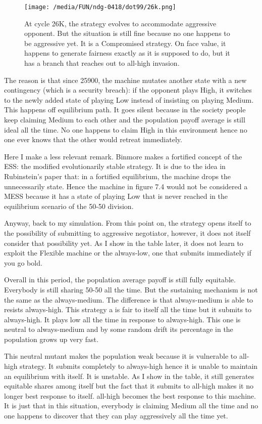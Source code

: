 \documentclass[12.5pt]{report}
\begin{document}
\begin{figure}[h!]
\center
\texttt{[image: /media/FUN/ndg-0418/dot99/26k.png]}
\caption{At cycle 26K, the strategy evolves to accommodate aggressive opponent. But the situation is still fine because no one happens to be aggressive yet. It is a Compromised strategy. On face value, it happens to generate fairness exactly as it is supposed to do, but it has a branch that reaches out to all-high invasion.}
\end{figure}

The reason is that since 25900, the machine mutates another state with a new contingency (which is a security breach): if the opponent plays High, it switches to the newly added state of playing Low instead of insisting on playing Medium. This happens off equilibrium path. It goes silent because in the society people keep claiming Medium to each other and the population payoff average is still ideal all the time. No one happens to claim High in this environment hence no one ever knows that the other would retreat immediately.

Here I make a less relevant remark. Binmore makes a fortified concept of the ESS: the modified evolutionarily stable strategy. It is due to the idea in Rubinstein's paper that: in a fortified equilibrium, the machine drops the unnecessarily state. Hence the machine in figure 7.4 would not be considered a MESS because it has a state of playing Low that is never reached in the equilibrium scenario of the 50-50 division.

Anyway, back to my simulation. From this point on, the strategy opens itself to the possibility of submitting to aggressive negotiator, however, it does not itself consider that possibility yet. As I show in the table later, it does not learn to exploit the Flexible machine or the always-low, one that submits immediately if you go bold.

Overall in this period, the population average payoff is still fully equitable. Everybody is still sharing 50-50 all the time. But the sustaining mechanism is not the same as the always-medium. The difference is that always-medium is able to resists always-high. This strategy a is fair to itself all the time but it submits to always-high. It plays low all the time in response to always-high. This one is neutral to always-medium and by some random drift its percentage in the population grows up very fast.

This neutral mutant makes the population weak because it is vulnerable to all-high strategy. It submits completely to always-high hence it is unable to maintain an equilibrium with itself. It is unstable. As I show in the table, it still generates equitable shares among itself but the fact that it submits to all-high makes it no longer best response to itself. all-high becomes the best response to this machine. It is just that in this situation, everybody is claiming Medium all the time and no one happens to discover that they can play aggressively all the time yet.
\end{document}

